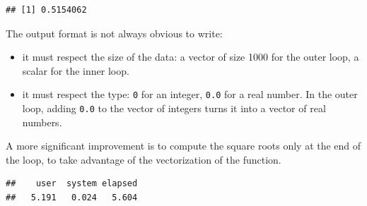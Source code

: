 \documentclass[
  12pt,
  american,
  a4paper,
  extrafontsizes,onecolumn,openright
  ]{memoir}
\newenvironment{Shaded}{\begin{snugshade}}{\end{snugshade}}
\newcommand{\ControlFlowTok}[1]{\textcolor[rgb]{0.13,0.29,0.53}{\textbf{#1}}}
\newcommand{\DecValTok}[1]{\textcolor[rgb]{0.00,0.00,0.81}{#1}}
\newcommand{\FunctionTok}[1]{\textcolor[rgb]{0.00,0.00,0.00}{#1}}
\newcommand{\NormalTok}[1]{#1}
\newcommand{\OtherTok}[1]{\textcolor[rgb]{0.56,0.35,0.01}{#1}}
\newcommand{\SpecialCharTok}[1]{\textcolor[rgb]{0.00,0.00,0.00}{#1}}
\providecommand{\tightlist}{%
  \setlength{\itemsep}{0pt}\setlength{\parskip}{0pt}}
\begin{document}
\begin{verbatim}
## [1] 0.5154062
\end{verbatim}

\normalsize

The output format is not always obvious to write:

\begin{itemize}
\tightlist
\item
  it must respect the size of the data: a vector of size 1000 for the outer loop, a scalar for the inner loop.
\item
  it must respect the type: \texttt{0} for an integer, \texttt{0.0} for a real number. In the outer loop, adding \texttt{0.0} to the vector of integers turns it into a vector of real numbers.
\end{itemize}

A more significant improvement is to compute the square roots only at the end of the loop, to take advantage of the vectorization of the function.

\scriptsize

\begin{Shaded}
\end{Shaded}

\begin{verbatim}
##    user  system elapsed 
##   5.191   0.024   5.604
\end{verbatim}
\end{document}
